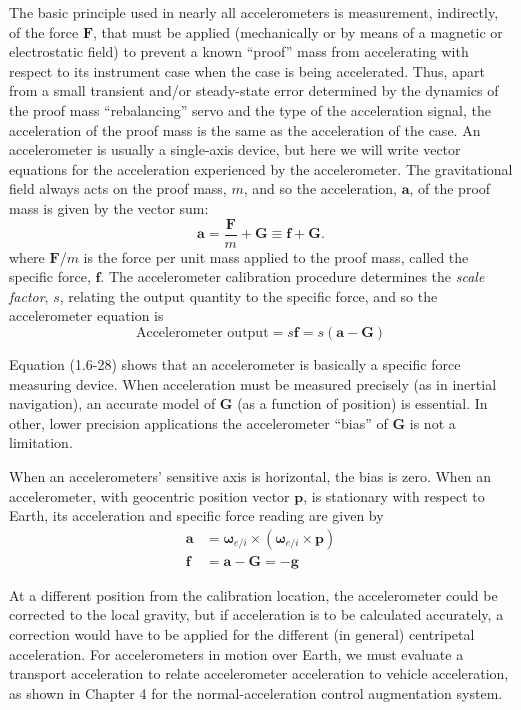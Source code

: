 The basic principle used in nearly all accelerometers is measurement, indirectly, of the force \(\mathbf{F}\), that must be applied (mechanically or by means of a magnetic or electrostatic field) to prevent a known ``proof'' mass from accelerating with respect to its instrument case when the case is being accelerated. Thus, apart from a small transient and/or steady-state error determined by the dynamics of the proof mass ``rebalancing'' servo and the type of the acceleration signal, the acceleration of the proof mass is the same as the acceleration of the case. An accelerometer is usually a single-axis device, but here we will write vector equations for the acceleration experienced by the accelerometer. The gravitational field always acts on the proof mass, \(m\), and so the acceleration, \(\mathbf{a}\), of the proof mass is given by the vector sum:
\begin{equation*}
    \mathbf{a} = \dfrac{\mathbf{F}}{m} + \mathbf{G} \equiv \mathbf{f} + \mathbf{G}.
\end{equation*}
where \(\mathbf{F}/m\) is the force per unit mass applied to the proof mass, called the specific force, \(\mathbf{f}\). The accelerometer calibration procedure determines the \textit{scale factor}, \(s\), relating the output quantity to the specific force, and so the accelerometer equation is
\begin{equation*} \tag{1.6-28}
    \text{Accelerometer output} = s \mathbf{f} = s \left(\mathbf{a} - \mathbf{G} \right)
\end{equation*}

Equation (1.6-28) shows that an accelerometer is basically a specific force measuring device. When acceleration must be measured precisely (as in inertial navigation), an accurate model of \(\mathbf{G}\) (as a function of position) is essential. In other, lower precision applications the accelerometer ``bias'' of \(\mathbf{G}\) is not a limitation.

When an accelerometers' sensitive axis is horizontal, the bias is zero. When an accelerometer, with geocentric position vector \(\mathbf{p}\), is stationary with respect to Earth, its acceleration and specific force reading are given by
\begin{align*}
    \mathbf{a} &= {\mathbf{\omega}_{e/i}}\!\times\!\left({\mathbf{\omega}_{e/i}}\!\times\!{\mathbf{p}}\right) \\
    \mathbf{f} &= \mathbf{a} - \mathbf{G} = -\!{\mathbf{g}} \tag{1.6-29}
\end{align*}

At a different position from the calibration location, the accelerometer could be corrected to the local gravity, but if acceleration is to be calculated accurately, a correction would have to be applied for the different (in general) centripetal acceleration. For accelerometers in motion over Earth, we must evaluate a transport acceleration to relate accelerometer acceleration to vehicle acceleration, as shown in Chapter 4 for the normal-acceleration control augmentation system.
